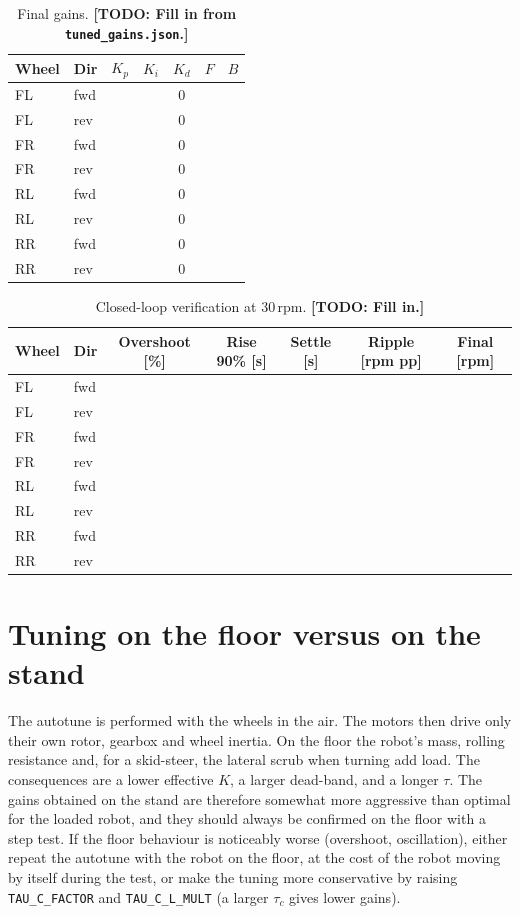 \documentclass[11pt,a4paper]{report}
\newcommand{\code}[1]{\texttt{#1}}
\newcommand{\todo}[1]{\textcolor{warnred}{\textbf{[TODO: #1]}}}
\begin{document}
\begin{table}[H]
\centering
\caption{Final gains. \todo{Fill in from \code{tuned\_gains.json}.}}\label{tab:gains}
\small
\begin{tabular}{@{}llccccc@{}}
\toprule
Wheel & Dir & $K_p$ & $K_i$ & $K_d$ & $F$ & $B$\\
\midrule
FL & fwd & & & 0 & & \\
FL & rev & & & 0 & & \\
FR & fwd & & & 0 & & \\
FR & rev & & & 0 & & \\
RL & fwd & & & 0 & & \\
RL & rev & & & 0 & & \\
RR & fwd & & & 0 & & \\
RR & rev & & & 0 & & \\
\bottomrule
\end{tabular}
\end{table}

\begin{table}[H]
\centering
\caption{Closed-loop verification at 30\,rpm. \todo{Fill in.}}\label{tab:verify}
\small
\begin{tabular}{@{}llccccc@{}}
\toprule
Wheel & Dir & Overshoot [\%] & Rise 90\% [s] & Settle [s] & Ripple [rpm pp] & Final [rpm]\\
\midrule
FL & fwd & & & & & \\
FL & rev & & & & & \\
FR & fwd & & & & & \\
FR & rev & & & & & \\
RL & fwd & & & & & \\
RL & rev & & & & & \\
RR & fwd & & & & & \\
RR & rev & & & & & \\
\bottomrule
\end{tabular}
\end{table}

\section{Tuning on the floor versus on the stand}\label{sec:load}
The autotune is performed with the wheels in the air. The motors then drive only their own rotor, gearbox and wheel inertia. On the floor the robot's mass, rolling resistance and, for a skid-steer, the lateral scrub when turning add load. The consequences are a lower effective $K$, a larger dead-band, and a longer $\tau$. The gains obtained on the stand are therefore somewhat more aggressive than optimal for the loaded robot, and they should always be confirmed on the floor with a step test. If the floor behaviour is noticeably worse (overshoot, oscillation), either repeat the autotune with the robot on the floor, at the cost of the robot moving by itself during the test, or make the tuning more conservative by raising \code{TAU\_C\_FACTOR} and \code{TAU\_C\_L\_MULT} (a larger $\tau_c$ gives lower gains).
\end{document}
